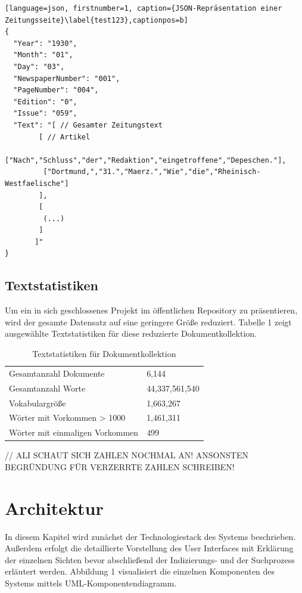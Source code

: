 \documentclass[11pt,a4paper, halfparskip]{scrartcl}
\begin{document}
\break

\begin{lstlisting}[language=json, firstnumber=1, caption={JSON-Repräsentation einer Zeitungsseite}\label{test123},captionpos=b]
{
  "Year": "1930",
  "Month": "01",
  "Day": "03",
  "NewspaperNumber": "001",
  "PageNumber": "004",
  "Edition": "0",
  "Issue": "059",
  "Text": "[ // Gesamter Zeitungstext
	    [ // Artikel
	     ["Nach","Schluss","der","Redaktion","eingetroffene","Depeschen."], 
	     ["Dortmund,","31.","Maerz.","Wie","die","Rheinisch-Westfaelische"] 
	    ], 
	    [
	     (...)
	    ] 
	   ]"
}
\end{lstlisting}

\subsection{Textstatistiken}
Um ein in sich geschlossenes Projekt im öffentlichen Repository zu präsentieren, wird der gesamte Datensatz auf eine geringere Größe reduziert.
Tabelle 1 zeigt ausgewählte Textstatistiken für diese reduzierte Dokumentkollektion.

\begin{table}[h!]
	\centering
	\begin{tabularx}{0.8\textwidth}{lX}
		\hline
		Gesamtanzahl Dokumente & 6,144\\
		Gesamtanzahl Worte & 44,337,561,540 \\
		Vokabulargröße & 1,663,267 \\
		Wörter mit Vorkommen > 1000 & 1,461,311 \\
		Wörter mit einmaligen Vorkommen & 499 \\
		\hline
	\end{tabularx}
	\caption{Textstatistiken für Dokumentkollektion}
\end{table}

// ALI SCHAUT SICH ZAHLEN NOCHMAL AN! ANSONSTEN BEGRÜNDUNG FÜR VERZERRTE ZAHLEN SCHREIBEN!

\section{Architektur}

In diesem Kapitel wird zunächst der Technologiestack des Systems beschrieben. 
Außerdem erfolgt die detaillierte Vorstellung des User Interfaces mit Erklärung der einzelnen Sichten bevor abschließend der Indizierungs- und der Suchprozess erläutert werden.
Abbildung 1 visualisiert die einzelnen Komponenten des Systems mittels UML-Komponentendiagramm. 
\end{document}
